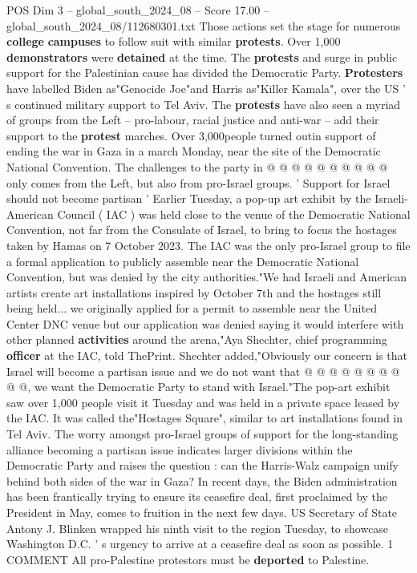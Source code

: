 \begin{textsample}{POS Dim 3 – global\_south\_2024\_08 – Score 17.00 – global\_south\_2024\_08/112680301.txt}
Those actions set the stage for numerous \textbf{college} \textbf{campuses} to follow suit with similar \textbf{protests}.
Over 1,000 \textbf{demonstrators} were \textbf{detained} at the time.
The \textbf{protests} and surge in public support for the Palestinian cause has divided the Democratic Party. \textbf{Protesters} have labelled Biden as"Genocide Joe"and Harris as"Killer Kamala", over the US ' s continued military support to Tel Aviv.
The \textbf{protests} have also seen a myriad of groups from the Left -- pro-labour, racial justice and anti-war -- add their support to the \textbf{protest} marches.
Over 3,000people turned outin support of ending the war in Gaza in a march Monday, near the site of the Democratic National Convention.
The challenges to the party in @ @ @ @ @ @ @ @ @ @ only comes from the Left, but also from pro-Israel groups. ' Support for Israel should not become partisan ' Earlier Tuesday, a pop-up art exhibit by the Israeli-American Council ( IAC ) was held close to the venue of the Democratic National Convention, not far from the Consulate of Israel, to bring to focus the hostages taken by Hamas on 7 October 2023.
The IAC was the only pro-Israel group to file a formal application to publicly assemble near the Democratic National Convention, but was denied by the city authorities."We had Israeli and American artists create art installations inspired by October 7th and the hostages still being held... we originally applied for a permit to assemble near the United Center DNC venue but our application was denied saying it would interfere with other planned \textbf{activities} around the arena,"Aya Shechter, chief programming \textbf{officer} at the IAC, told ThePrint.
Shechter added,"Obviously our concern is that Israel will become a partisan issue and we do not want that @ @ @ @ @ @ @ @ @ @, we want the Democratic Party to stand with Israel."The pop-art exhibit saw over 1,000 people visit it Tuesday and was held in a private space leased by the IAC.
It was called the"Hostages Square", similar to art installations found in Tel Aviv.
The worry amongst pro-Israel groups of support for the long-standing alliance becoming a partisan issue indicates larger divisions within the Democratic Party and raises the question : can the Harris-Walz campaign unify behind both sides of the war in Gaza?
In recent days, the Biden administration has been frantically trying to ensure its ceasefire deal, first proclaimed by the President in May, comes to fruition in the next few days.
US Secretary of State Antony J.
Blinken wrapped his ninth visit to the region Tuesday, to showcase Washington D.C. ' s urgency to arrive at a ceasefire deal as soon as possible. 1 COMMENT All pro-Palestine protestors must be \textbf{deported} to Palestine.

\end{textsample}
